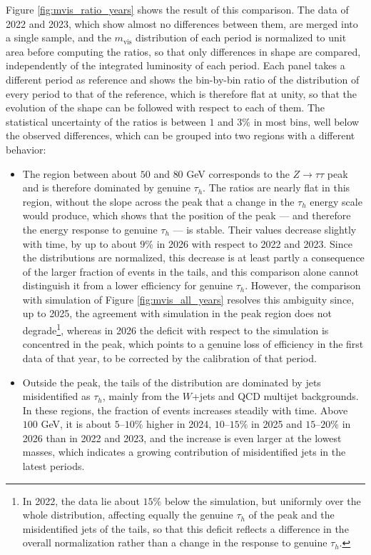 Figure \ref{fig:mvis_ratio_years} shows the result of this comparison. The data of 2022 and 2023, which show almost no differences between them, are merged into a single sample, and the $m_\text{vis}$ distribution of each period is normalized to unit area before computing the ratios, so that only differences in shape are compared, independently of the integrated luminosity of each period. Each panel takes a different period as reference and shows the bin-by-bin ratio of the distribution of every period to that of the reference, which is therefore flat at unity, so that the evolution of the shape can be followed with respect to each of them. The statistical uncertainty of the ratios is between $1$ and $3\%$ in most bins, well below the observed differences, which can be grouped into two regions with a different behavior:
\begin{itemize}
    \item The region between about $50$ and $80$ GeV corresponds to the $Z\to\tau\tau$ peak and is therefore dominated by genuine $\tau_h$. The ratios are nearly flat in this region, without the slope across the peak that a change in the $\tau_h$ energy scale would produce, which shows that the position of the peak — and therefore the energy response to genuine $\tau_h$ — is stable. Their values decrease slightly with time, by up to about $9\%$ in 2026 with respect to 2022 and 2023. Since the distributions are normalized, this decrease is at least partly a consequence of the larger fraction of events in the tails, and this comparison alone cannot distinguish it from a lower efficiency for genuine $\tau_h$. However, the comparison with simulation of Figure \ref{fig:mvis_all_years} resolves this ambiguity since, up to 2025, the agreement with simulation in the peak region does not degrade\footnote{In 2022, the data lie about $15\%$ below the simulation, but uniformly over the whole distribution, affecting equally the genuine $\tau_h$ of the peak and the misidentified jets of the tails, so that this deficit reflects a difference in the overall normalization rather than a change in the response to genuine $\tau_h$.}, whereas in 2026 the deficit with respect to the simulation is concentred in the peak, which points to a genuine loss of efficiency in the first data of that year, to be corrected by the calibration of that period.
    \item Outside the peak, the tails of the distribution are dominated by jets misidentified as $\tau_h$, mainly from the $W$+jets and QCD multijet backgrounds. In these regions, the fraction of events increases steadily with time. Above $100$ GeV, it is about $5$--$10\%$ higher in 2024, $10$--$15\%$ in 2025 and $15$--$20\%$ in 2026 than in 2022 and 2023, and the increase is even larger at the lowest masses, which indicates a growing contribution of misidentified jets in the latest periods.
\end{itemize}
